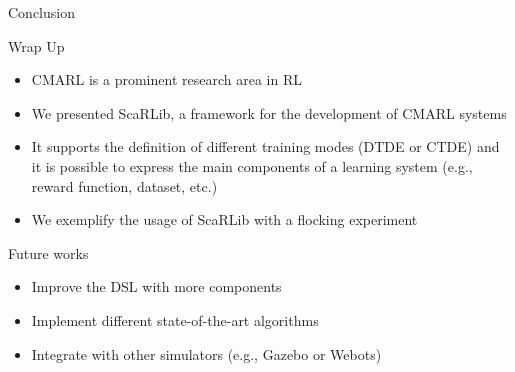 \documentclass[presentation, 9pt]{beamer}\mode<presentation>{\usetheme{AMSBolognaFC}}
\begin{document}
\begin{frame}{Conclusion}
\begin{exampleblock}{Wrap Up}
	\begin{itemize}
		\item CMARL is a prominent research area in RL
		\item We presented ScaRLib, a framework for the development of CMARL systems
		\item It supports the definition of different training modes (DTDE or CTDE) and it is possible to express the main components of a learning system (e.g., reward function, dataset, etc.)
		\item We exemplify the usage of ScaRLib with a flocking experiment
	\end{itemize}
\end{exampleblock}
\begin{alertblock}{Future works}
	\begin{itemize}
		\item Improve the DSL with more components
		\item Implement different state-of-the-art algorithms
		\item Integrate with other simulators (e.g., Gazebo or Webots)
	\end{itemize}
\end{alertblock}
\end{frame}
\end{document}
